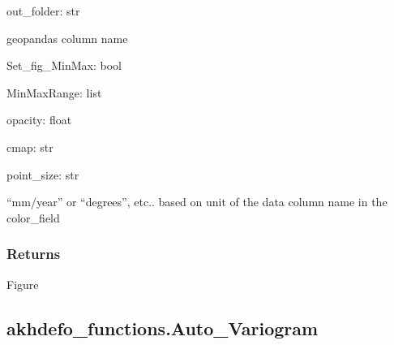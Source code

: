 \documentclass[letterpaper,10pt]{sphinxmanual}
\begin{document}
\begin{fulllineitems}
\sphinxAtStartPar
out\_folder: str
\begin{description}
\sphinxAtStartPar
geopandas column name

\end{description}

\sphinxAtStartPar
Set\_fig\_MinMax: bool

\sphinxAtStartPar
MinMaxRange: list

\sphinxAtStartPar
opacity: float

\sphinxAtStartPar
cmap: str

\sphinxAtStartPar
point\_size: str
\begin{description}
\sphinxAtStartPar
“mm/year” or “degrees”, etc.. based on unit of the data column name in the color\_field

\end{description}


\subsubsection{Returns}
\label{\detokenize{generated/akhdefo_functions.MeanProducts_plot_ts:returns}}
\sphinxAtStartPar
Figure

\end{fulllineitems}


\sphinxstepscope


\subsection{akhdefo\_functions.Auto\_Variogram}
\label{\detokenize{generated/akhdefo_functions.Auto_Variogram:akhdefo-functions-auto-variogram}}\label{\detokenize{generated/akhdefo_functions.Auto_Variogram::doc}}
\end{document}
